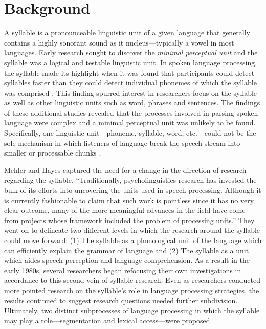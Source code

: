 \documentclass[
12pt, %
english, %
doublespacing, %
nolistspacing, %
liststotoc, %
headsepline, %
chapterinoneline, %
openany, %
]{DoctoralThesis}\usepackage[]{graphicx}\usepackage[]{color}
\begin{document}
\section{Background}
A syllable is a pronounceable linguistic unit of a given language that generally contains a highly sonorant sound as it nucleus—typically a vowel in most languages. Early research sought to discover the \emph{minimal perceptual unit} and the syllable was a logical and testable linguistic unit. In spoken language processing, the syllable made its highlight when it was found that participants could detect syllables faster than they could detect individual phonemes of which the syllable was comprised \citep*{Savin1970-oy}. This finding spurred interest in researchers focus on the syllable as well as other linguistic units such as word, phrases and sentences. The findings of these additional studies revealed that the processes involved in parsing spoken language were complex and a minimal perceptual unit was unlikely to be found. %
Specifically, one linguistic unit—phoneme, syllable, word, etc.—could not be the sole mechanism in which listeners of language break the speech stream into smaller or processable chunks \citep{Foss1973-ll,Healy1976-js,McNeill1973-bo}. 

Mehler and Hayes \parencite*{Mehler1981-wp} captured the need for a change in the direction of research regarding the syllable, “Traditionally, psycholinguistics research has invested the bulk of its efforts into uncovering the units used in speech processing. Although it is currently fashionable to claim that such work is pointless since it has no very clear outcome, many of the more meaningful advances in the field have come from projects whose framework included the problem of processing units.” They went on to delineate two different levels in which the research around the syllable could move forward: (1) The syllable as a phonological unit of the language which can efficiently explain the grammar of language and (2) The syllable as a unit which aides speech perception and language comprehension. As a result in the early 1980s, several researchers began refocusing their own investigations in accordance to this second vein of syllable research. %
Even as researchers conducted more pointed research on the syllable's role in language processing strategies, the results continued to suggest research questions needed further subdivision. Ultimately, two distinct subprocesses of language processing in which the syllable may play a role---segmentation and lexical access---were proposed. 
\end{document}
